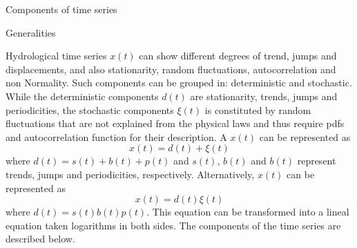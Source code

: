 \documentclass[8pt]{beamer}
\renewcommand{\emph}[1]{\textcolor{myorange}{#1}}
\begin{document}
\begin{frame}{Components of time series}
    \begin{block}{Generalities}
    \end{block}
    \emph{Hydrological time series} $x(t)$ can show different degrees of \emph{trend}, \emph{jumps} and \emph{displacements}, and also \emph{stationarity}, \emph{random fluctuations}, \emph{autocorrelation} and \emph{non Normality}. Such components can be grouped in: \alert{deterministic} and \alert{stochastic}. While the \emph{deterministic} components $d(t)$ are \emph{stationarity}, \emph{trends}, \emph{jumps} and \emph{periodicities}, the \emph{stochastic} components $\xi (t)$ is constituted by \emph{random fluctuations} that are not explained from the physical laws and thus require \emph{pdf}s and \emph{autocorrelation} function for their description. A $x(t)$ can be represented as
    \[
        x(t) = d(t) + \xi(t)
    \]
    where $d(t) = s(t) + b(t) + p(t)$ and $s(t)$, $b(t)$ and $b(t)$ represent trends, jumps and periodicities, respectively. Alternatively, $x(t)$ can be represented as
    \[
        x(t) = d(t) \xi(t)
    \]
where $d(t) = s(t) b(t) p(t)$. This equation can be transformed into a lineal equation taken logarithms in both sides. The components of the time series are described below.  
\end{frame}
\end{document}
